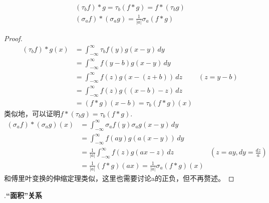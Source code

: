 \begin{proposition}
    \begin{align*}
    (\tau_b f)*g=\tau_b (f*g)=f*(\tau_b g) \\
    (\sigma_a f)*(\sigma_a g)=\frac{1}{|a|}\sigma_a(f*g)
\end{align*}
\end{proposition}
\begin{proof}
    \begin{align*}
    (\tau_b f)*g(x) & =\int_{-\infty}^{\infty}\tau_b f(y)g(x-y)\,dy           \\
                    & =\int_{-\infty}^{\infty}f(y-b)g(x-y)\,dy                \\
                    & =\int_{-\infty}^{\infty}f(z)g(x-(z+b))\,dz    & (z=y-b) \\
                    & =\int_{-\infty}^{\infty}f(z)g((x-b)-z)\,dz              \\
                    & =(f*g)(x-b)=\tau_b (f*g)(x)
\end{align*}
类似地，可以证明$f*(\tau_b g)=\tau_b (f*g)$.
\begin{align*}
    (\sigma_a f)*(\sigma_a g)(x) & =\int_{-\infty}^{\infty}\sigma_a f(y)\sigma_a g(x-y)\,dy                          \\
                                 & =\int_{-\infty}^{\infty}f(ay)g(a(x-y))\,dy                                        \\
                                 & =\frac{1}{|a|}\int_{-\infty}^{\infty}f(z)g(a x - z)\,dz  & \left(z=ay,dy=\frac{dz}{a}\right) \\
                                 & =\frac{1}{|a|}(f*g)(a x)=\frac{1}{|a|}\sigma_a(f*g)(x)
\end{align*}
和傅里叶变换的伸缩定理类似，这里也需要讨论a的正负，但不再赘述。
\end{proof}

.\textbf{“面积”关系}


